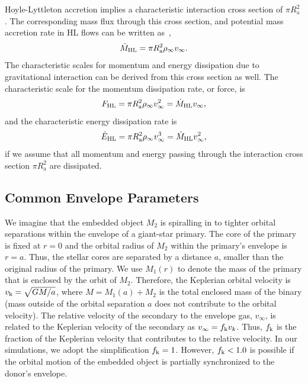 Hoyle-Lyttleton accretion implies a characteristic interaction cross section of $\pi R_{\mathrm{a}}^2$ \cite{1939PCPS...35..405H}.
The corresponding mass flux through this cross section, and potential mass accretion rate in HL flows can be written as~\cite{Edgar:2004},
\begin{equation}\label{eq:mdotHL}
\dot M_{\rm HL} = \pi R_{\mathrm{a}}^2 \rho_\infty v_\infty. 
\end{equation}
The characteristic scales for momentum and energy dissipation due to gravitational interaction \cite{1999ApJ...513..252O} can be derived from this cross section as well. The characteristic scale for the momentum dissipation rate, or force, is
\begin{equation}\label{eq:fHL}
    F_{\rm HL} = \pi R_{\mathrm{a}}^2 \rho_\infty v_\infty^2 = \dot M_{\rm HL} v_\infty, 
\end{equation}
and the characteristic energy dissipation rate is
\begin{equation}
    \dot E_{\rm HL} = \pi R_{\mathrm{a}}^2 \rho_\infty v_\infty^3 = \dot M_{\rm HL} v_\infty^2, 
\end{equation}
if we assume that all momentum and energy passing through the interaction cross section $\pi R_{\mathrm{a}}^2$ are dissipated. 

\subsection{Common Envelope Parameters}

We imagine that the embedded object $M_2$ is spiralling in to tighter orbital separations within the envelope of a giant-star primary.  The core of the primary is fixed at $r = 0$ and the orbital radius of $M_2$ within  the primary's envelope is $r = a$. Thus, the stellar cores are separated by a distance $a$, smaller than the original radius of the primary.  We use $M_1(r)$ to denote the mass of the primary that is enclosed by the orbit of $M_2$. Therefore, the Keplerian orbital velocity is $v_{\rm k} = \sqrt{GM/a}$,
where $M = M_{1}(a) + M_{2}$ is the total enclosed mass of the binary (mass outside of the orbital separation $a$ does not contribute to the orbital velocity). The relative velocity of the secondary to the envelope gas, $v_{\infty}$, is related to the Keplerian velocity of the secondary as $v_{\infty} = f_{\rm k}v_{k}$. Thus, $f_{\rm k}$ is the fraction of the Keplerian velocity that contributes to the relative velocity. In our simulations, we adopt the simplification $f_{\rm k} = 1$. However, $f_{\rm k} < 1.0$ is possible if the orbital motion of the embedded object is partially synchronized to the donor's envelope.


